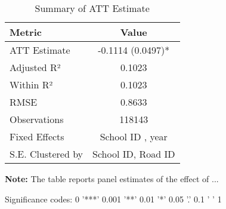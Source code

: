 \begin{table}[H]
\centering
\caption{Summary of ATT Estimate}
\label{tab:SA_math_0p}
 \begin{center}
 \begin{tabular}{lc}
 \toprule
Metric & Value \\
\midrule
ATT Estimate & -0.1114 (0.0497)* \\
\hline 
 Adjusted R² & 0.1023 \\
Within R² & 0.1023 \\
RMSE & 0.8633 \\
Observations & 118143 \\
\hline 
 Fixed Effects & School ID ,  year \\
S.E. Clustered by & School ID, Road ID \\
\bottomrule
\end{tabular}
 \end{center}\begin{tablenotes}
\small
\item \textbf{Note:} The table reports panel estimates of the effect of ...
\item Significance codes: 0 '***' 0.001 '**' 0.01 '*' 0.05 '.' 0.1 ' ' 1
\end{tablenotes}
\end{table}
